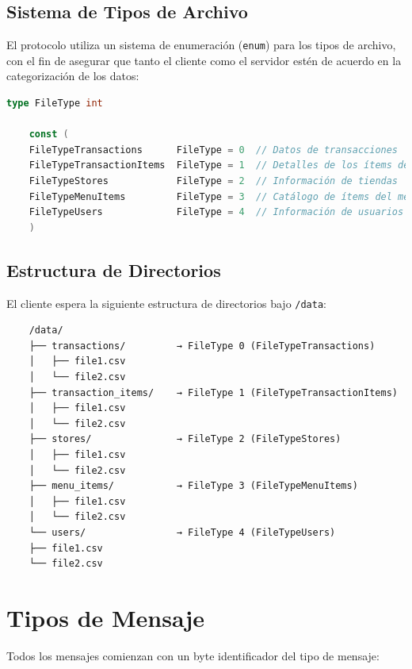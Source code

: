 \documentclass[titlepage,a4paper]{article}
\begin{document}
\subsection{Sistema de Tipos de Archivo}

El protocolo utiliza un sistema de enumeración (\texttt{enum}) para los tipos de archivo, con el fin de asegurar que tanto el cliente como el servidor estén de acuerdo en la categorización de los datos:

\begin{lstlisting}[language=Go]
	type FileType int
	
	const (
	FileTypeTransactions      FileType = 0  // Datos de transacciones
	FileTypeTransactionItems  FileType = 1  // Detalles de los ítems de transacción
	FileTypeStores            FileType = 2  // Información de tiendas
	FileTypeMenuItems         FileType = 3  // Catálogo de ítems del menú
	FileTypeUsers             FileType = 4  // Información de usuarios
	)
\end{lstlisting}

\subsection*{Estructura de Directorios}

El cliente espera la siguiente estructura de directorios bajo \texttt{/data}:

\begin{lstlisting}
	/data/
	├── transactions/         → FileType 0 (FileTypeTransactions)
	│   ├── file1.csv
	│   └── file2.csv
	├── transaction_items/    → FileType 1 (FileTypeTransactionItems)
	│   ├── file1.csv
	│   └── file2.csv
	├── stores/               → FileType 2 (FileTypeStores)
	│   ├── file1.csv
	│   └── file2.csv
	├── menu_items/           → FileType 3 (FileTypeMenuItems)
	│   ├── file1.csv
	│   └── file2.csv
	└── users/                → FileType 4 (FileTypeUsers)
	├── file1.csv
	└── file2.csv
\end{lstlisting}

\section{Tipos de Mensaje}

Todos los mensajes comienzan con un byte identificador del tipo de mensaje:
\end{document}

